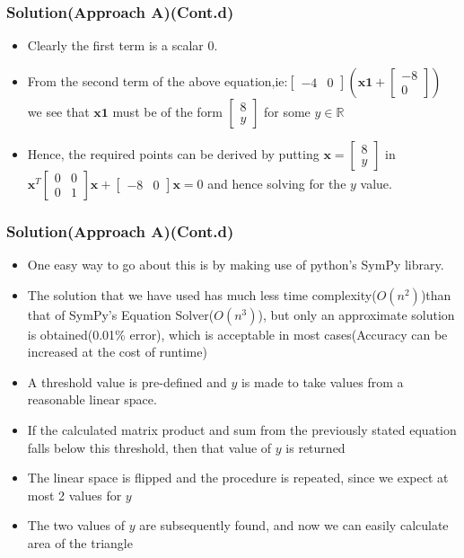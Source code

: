 \documentclass{beamer}
\begin{document}
\begin{frame}
\frametitle{Solution(Approach A)(Cont.d)}
\begin{itemize}	
	\item<1-> Clearly the first term is a scalar $0$.
	\item<2-> From the second term of the above equation,ie:\newline$\begin{bmatrix} -4 & 0
	\end{bmatrix} (\mathbf{x1} +\begin{bmatrix} -8 \\ 0
	\end{bmatrix} )$ we see that $\mathbf{x1}$ must be of the form $\begin{bmatrix} 8 \\ y
	\end{bmatrix}$ for some $y \in$$ \mathbb{R}$
	\item<3-> Hence, the required points can be derived by putting $\mathbf{x} =\begin{bmatrix} 8 \\ y
	\end{bmatrix} $ in $\mathbf{x}^T \begin{bmatrix} 0 & 0 \\0 & 1
	\end{bmatrix} \mathbf{x} + \begin{bmatrix} -8 & 0
	\end{bmatrix} \mathbf{x} = 0$ \newline
	\newline and hence solving for the $y$ value.
\end{itemize}
\end{frame}
\begin{frame}
\frametitle{Solution(Approach A)(Cont.d)}
\begin{itemize}	
	\item<1-> One easy way to go about this is by making use of python's SymPy library.
	\item<2-> The solution that we have used has much less time complexity($O(n^{2})$)than that of SymPy's Equation Solver($O(n^{3})$), but only an approximate solution is obtained(0.01\% error), which is acceptable in most cases(Accuracy can be increased at the cost of runtime)
	\item<3-> A threshold value is pre-defined and $y$ is made to take values from a reasonable linear space.
	\item<4-> If the calculated matrix product and sum from the previously stated equation falls below this threshold, then that value of $y$ is returned
	\item<5-> The linear space is flipped and the procedure is repeated, since we expect at most 2 values for $y$
	\item<6-> The two values of $y$ are subsequently found, and now we can easily calculate area of the triangle
\end{itemize}
\end{frame}
\end{document}
